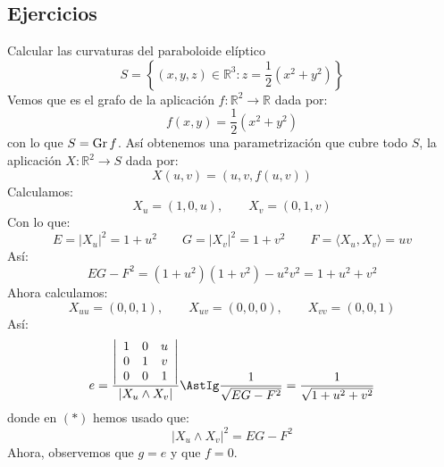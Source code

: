 \subsection{Ejercicios}
\begin{ejercicio}
    Calcular las curvaturas del paraboloide elíptico
    \begin{equation*}
        S = \left\{(x,y,z)\in \mathbb{R}^3 : z=\frac{1}{2}(x^2+y^2)\right\}
    \end{equation*}
    Vemos que es el grafo de la aplicación $f:\mathbb{R}^2\to \mathbb{R}$ dada por:
    \begin{equation*}
        f(x,y) = \frac{1}{2}(x^2+y^2)
    \end{equation*}
    con lo que $S = \operatorname{Gr} f$. Así obtenemos una parametrización que cubre todo $S$, la aplicación $X:\mathbb{R}^2\to S$ dada por:
    \begin{equation*}
        X(u,v) = (u, v, f(u,v))
    \end{equation*}
    Calculamos:
    \begin{equation*}
        X_u = (1, 0, u), \qquad X_v = (0, 1, v) 
    \end{equation*}
    Con lo que:
    \begin{equation*}
        E = |X_u|^2 = 1 + u^2 \qquad 
        G = |X_v|^2 = 1 + v^2 \qquad 
        F = \langle X_u,X_v \rangle = uv 
    \end{equation*}
    Así:
    \begin{equation*}
        EG-F^2 = (1+u^2)(1+v^2) - u^2v^2 = 1 + u^2 + v^2
    \end{equation*}
    Ahora calculamos:
    \begin{equation*}
        X_{uu} = (0, 0, 1), \qquad X_{uv} = (0,0,0), \qquad X_{vv} = (0,0,1)
    \end{equation*}
    Así:
    \begin{equation*}
        e = \frac{\left|\begin{array}{ccc}
            1 & 0 & u \\
            0 & 1 & v \\
            0 & 0 & 1
        \end{array}\right|}{|X_u\land X_v|} \AstIg \frac{1}{\sqrt{EG - F^2}} = \frac{1}{\sqrt{1+u^2+v^2}}
    \end{equation*}
    donde en $(\ast)$ hemos usado que:
    \begin{equation*}
        |X_u \land X_v|^2 = EG-F^2
    \end{equation*}
    Ahora, observemos que $g = e$ y que $f = 0$.\\


\end{ejercicio}
